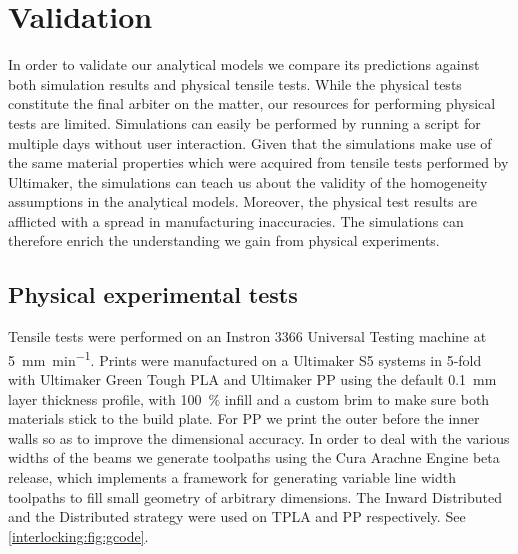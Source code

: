 \section{Validation}\label{interlocking:sec:validation}
In order to validate our analytical models we compare its predictions against both simulation results and physical tensile tests.
While the physical tests constitute the final arbiter on the matter,
our resources for performing physical tests are limited.
Simulations can easily be performed by running a script for multiple days without user interaction.
Given that the simulations make use of the same material properties which were acquired from tensile tests performed by Ultimaker,
the simulations can teach us about the validity of the homogeneity assumptions in the analytical models.
Moreover, the physical test results are afflicted with a spread in manufacturing inaccuracies.
The simulations can therefore enrich the understanding we gain from physical experiments.







\subsection{Physical experimental tests}
Tensile tests were performed on an Instron 3366 Universal Testing machine at \SI{5}{\milli\meter\per\minute}.
Prints were manufactured on a Ultimaker S5 systems in 5-fold with Ultimaker Green Tough PLA and Ultimaker PP using the default \SI{0.1}{\milli\meter} layer thickness profile,
with \SI{100}{\percent} infill and a custom brim to make sure both materials stick to the build plate.
For PP we print the outer before the inner walls so as to improve the dimensional accuracy. %
In order to deal with the various widths of the beams we generate toolpaths using the Cura Arachne Engine beta release\cite{CuraArachne},
which implements a framework for generating variable line width toolpaths to fill small geometry of arbitrary dimensions\cite{Kuipers2020}.
The Inward Distributed and the Distributed strategy were used on TPLA and PP respectively.
See \cref{interlocking:fig:gcode}.



